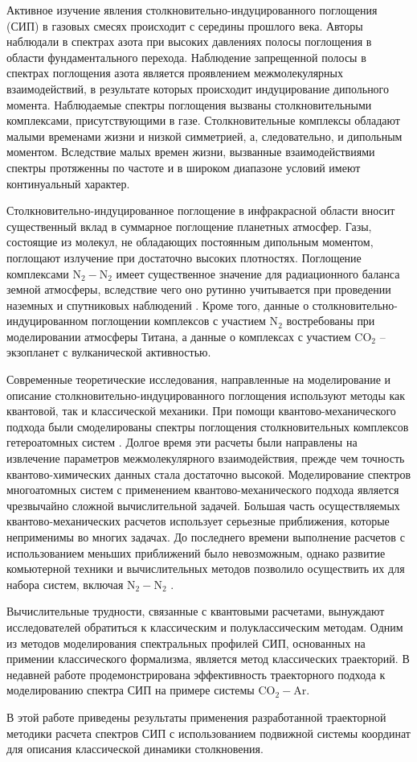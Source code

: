 Активное изучение явления столкновительно-индуцированного поглощения (СИП) в газовых смесях происходит с середины прошлого века. Авторы \cite{crawford1949} наблюдали в спектрах азота при высоких давлениях полосы поглощения в области фундаментального перехода. Наблюдение запрещенной полосы в спектрах поглощения азота является проявлением межмолекулярных взаимодействий, в результате которых происходит индуцирование дипольного момента. Наблюдаемые спектры поглощения вызваны столкновительными комплексами, присутствующими в газе. Столкновительные комплексы обладают малыми временами жизни и низкой симметрией, а, следовательно, и дипольным моментом. Вследствие малых времен жизни, вызванные взаимодействиями спектры протяженны по частоте и в широком диапазоне условий имеют континуальный характер. \par 
Столкновительно-индуцированное поглощение в инфракрасной области вносит существенный вклад в суммарное поглощение планетных атмосфер. Газы, состоящие из молекул, не обладающих постоянным дипольным моментом, поглощают излучение при достаточно высоких плотностях. Поглощение комплексами N$_2-$N$_2$ имеет существенное значение для радиационного баланса земной атмосферы, вследствие чего оно рутинно учитывается при проведении наземных и спутниковых наблюдений \cite{sioris2014}. Кроме того, данные о столкновительно-индуцированном поглощении комплексов с участием N$_2$ востребованы при моделировании атмосферы Титана, а данные о комплексах с участием CO$_2$ -- экзопланет с вулканической активностью. \par
Современные теоретические исследования, направленные на моделирование и описание столкновительно-индуцированного поглощения используют методы как квантовой, так и классической механики. При помощи квантово-механического подхода были смоделированы спектры поглощения столкновительных комплексов гетероатомных систем \cite{sharma1975, meyer1986}. Долгое время эти расчеты были направлены на извлечение параметров межмолекулярного взаимодействия, прежде чем точность квантово-химических данных стала достаточно высокой. Моделирование спектров многоатомных систем с применением квантово-механического подхода является чрезвычайно сложной вычислительной задачей. Большая часть осуществляемых квантово-механических расчетов использует серьезные приближения, которые неприменимы во многих задачах. До последнего времени выполнение расчетов с использованием меньших приближений было невозможным, однако развитие комьютерной техники и вычислительных методов позволило осуществить их для набора систем, включая N$_2-$N$_2$ \cite{karman2015}. \par
Вычислительные трудности, связанные с квантовыми расчетами, вынуждают исследователей обратиться к классическим и полуклассическим методам. Одним из методов моделирования спектральных профилей СИП, основанных на примении классического формализма, является метод классических траекторий. В недавней работе \cite{oparin2017} продемонстрирована эффективность траекторного подхода к моделированию спектра СИП на примере системы CO$_2-$Ar. \par
В этой работе приведены результаты применения разработанной траекторной методики расчета спектров СИП с использованием подвижной системы координат для описания классической динамики столкновения. 

